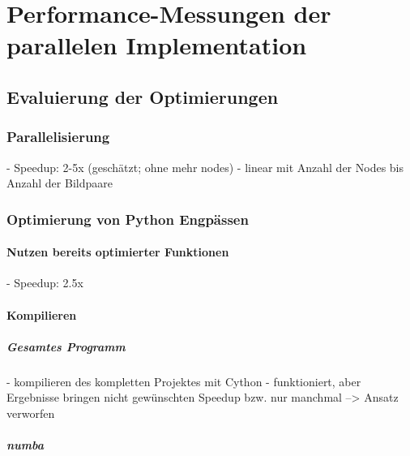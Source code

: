 \chapter{Performance-Messungen der parallelen Implementation}

\section{Evaluierung der Optimierungen}

\subsection{Parallelisierung}

\begin{correctmore}
	- Speedup: 2-5x (geschätzt; ohne mehr nodes)
	- linear mit Anzahl der Nodes bis Anzahl der Bildpaare
\end{correctmore}

\subsection{Optimierung von Python Engpässen}

\subsubsection{Nutzen bereits optimierter Funktionen}

\begin{correctmore}
	- Speedup: 2.5x
\end{correctmore}

\subsubsection{Kompilieren}

\paragraph{Gesamtes Programm}

\begin{correctmore}
	- kompilieren des kompletten Projektes mit Cython
	- funktioniert, aber Ergebnisse bringen nicht gewünschten Speedup bzw. nur manchmal
	--> Ansatz verworfen
\end{correctmore}

\paragraph{numba}

